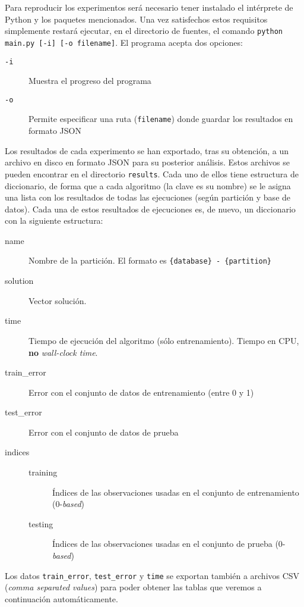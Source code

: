 \documentclass[11pt]{article}
\theoremstyle{plain}
\theoremstyle{definition}
\begin{document}
Para reproducir los experimentos será necesario tener instalado el intérprete de Python \cite{cpython} y los paquetes mencionados. Una vez satisfechos estos requisitos simplemente restará ejecutar, en el directorio de fuentes, el comando \texttt{python main.py [-i] [-o filename]}. El programa acepta dos opciones:

\begin{description}
\item[\texttt{-i}] Muestra el progreso del programa
\item[\texttt{-o}] Permite especificar una ruta (\texttt{filename}) donde guardar los resultados en formato JSON
\end{description}

Los resultados de cada experimento se han exportado, tras su obtención, a un archivo en disco en formato JSON \cite{json} para su posterior análisis. Estos archivos se pueden encontrar en el directorio \texttt{results}. Cada uno de ellos tiene estructura de diccionario, de forma que a cada algoritmo (la clave es su nombre) se le asigna una lista con los resultados de todas las ejecuciones (según partición y base de datos). Cada una de estos resultados de ejecuciones es, de nuevo, un diccionario con la siguiente estructura:

\begin{description}
\item[name] Nombre de la partición. El formato es \texttt{\{database\} - \{partition\}}
\item[solution] Vector solución.
\item[time] Tiempo de ejecución del algoritmo (sólo entrenamiento). Tiempo en CPU, \textbf{no} \textit{wall-clock time}.
\item[train\_error] Error con el conjunto de datos de entrenamiento (entre 0 y 1)
\item[test\_error] Error con el conjunto de datos de prueba
\item[indices] \hfill
  \begin{description}
  \item[training] Índices de las observaciones usadas en el conjunto de entrenamiento (0-\textit{based})
  \item[testing] Índices de las observaciones usadas en el conjunto de prueba (0-\textit{based})
  \end{description}
\end{description}

Los datos \texttt{train\_error}, \texttt{test\_error} y \texttt{time} se exportan también a archivos CSV (\textit{comma separated values}) para poder obtener las tablas que veremos a continuación automáticamente. \\
\end{document}

